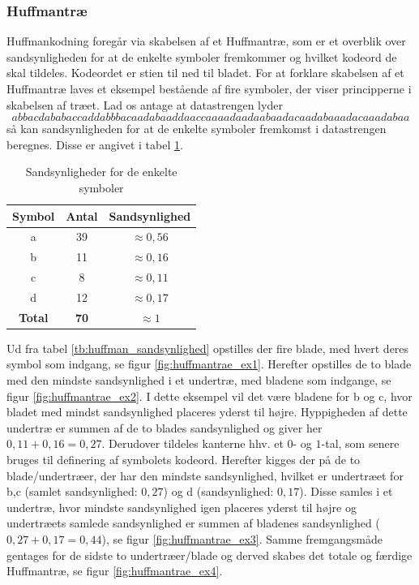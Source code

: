 \subsubsection{Huffmantræ} \label{sec:huffmanteori}
Huffmankodning foregår via skabelsen af et Huffmantræ, som er et overblik over sandsynligheden for at de enkelte symboler fremkommer og hvilket kodeord de skal tildeles. Kodeordet er stien til ned til bladet. For at forklare skabelsen af et Huffmantræ laves et eksempel bestående af fire symboler, der viser principperne i skabelsen af træet.
Lad os antage at datastrengen lyder $$ abbacdababaccaddabbbacaadabaaddaaccaaaadaadaabaadacaadabaaadacaaadabaa $$ så kan sandsynligheden for at de enkelte symboler fremkomst i datastrengen beregnes. Disse er angivet i tabel \ref{tb:huffman_sandsynlighed}.
\begin{table}[!h]
\centering
\begin{tabular}{|c|c|c|} 
\hline
\textbf{Symbol}	&	\textbf{Antal}	&	\textbf{Sandsynlighed}			\\ \hline
a				&	39				&	$\approx  0,56$					\\ \hline
b				&	11				&	$\approx  0,16$					\\ \hline
c				&	8				&	$\approx  0,11$					\\ \hline
d				&	12				&	$\approx  0,17$					\\ \hline
\textbf{Total}	&	\textbf{70}		&	\textbf{$\approx 1$}			\\ \hline
\end{tabular}
\caption{Sandsynligheder for de enkelte symboler}
\label{tb:huffman_sandsynlighed}
\end{table}

Ud fra tabel \vref{tb:huffman_sandsynlighed} opstilles der fire blade, med hvert deres symbol som indgang, se figur \vref{fig:huffmantrae_ex1}. Herefter opstilles de to blade med den mindste sandsynlighed i et undertræ, med bladene som indgange, se figur \vref{fig:huffmantrae_ex2}. I dette eksempel vil det være bladene for b og c, hvor bladet med mindst sandsynlighed placeres yderst til højre. Hyppigheden af dette undertræ er summen af de to blades sandsynlighed og giver her $0,11+0,16=0,27$. Derudover tildeles kanterne hhv. et $0$- og $1$-tal, som senere bruges til definering af symbolets kodeord. Herefter kigges der på de to blade/undertræer, der har den mindste sandsynlighed, hvilket er undertræet for b,c (samlet sandsynlighed: $0,27$) og d (sandsynlighed: $0,17$). Disse samles i et undertræ, hvor mindste sandsynlighed igen placeres yderst til højre og undertræets samlede sandsynlighed er summen af bladenes sandsynlighed ($0,27+0,17=0,44$), se figur \vref{fig:huffmantrae_ex3}. Samme fremgangsmåde gentages for de sidste to undertræer/blade og derved skabes det totale og færdige Huffmantræ, se figur \vref{fig:huffmantrae_ex4}.

